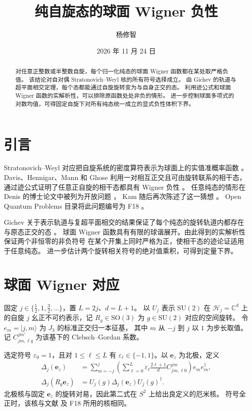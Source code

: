 \documentclass[UTF8,11pt,a4paper]{ctexart}
\title{\textbf{纯自旋态的球面 Wigner 负性}}
\author{杨修智}
\date{2026 年 11 月 24 日}
\theoremstyle{definition}
\newcommand{\SU}{\mathrm{SU}}
\newcommand{\SO}{\mathrm{SO}}
\begin{document}
\maketitle

\begin{abstract}
对任意正整数或半整数自旋，每个归一化纯态的球面 Wigner 函数都在某处取严格负值。
该结论对自对偶 Stratonovich--Weyl 核的所有符号选择成立。
由 Gichev 的轨道与超平面相交定理，每个态都能通过自旋旋转变为与自身正交的态。
利用迹公式和球面 Wigner 函数的实解析性，可以排除原函数处处非负的情形。
进一步控制球面多项式的对数均值，可得固定自旋下对所有纯态统一成立的显式负性体积下界。
\end{abstract}

\section{引言}

Stratonovich--Weyl 对应把自旋系统的密度算符表示为球面上的实值准概率函数
\cite{varilly1989,davis2021}。
Davis、Hennigar、Mann 和 Ghose 利用一对相互正交且可由旋转联系的相干态，
通过迹公式证明了任意正自旋的相干态都具有 Wigner 负性 \cite[第 3 节]{davis2023}。
任意纯态的情形在 Denis 的博士论文中被列为开放问题 \cite[第 3 页]{denis2025}，
Kam 随后再次陈述了这一猜想 \cite[第 I、VI 节]{kam2026}。
Open Quantum Problems 目录将此问题编号为 F18 \cite{f18}。

Gichev 关于表示轨道与复超平面相交的结果保证了每个纯态的旋转轨道内都存在与原态正交的态
\cite[推论 1]{gichev2004}。
球面 Wigner 函数具有有限的球谐展开。由此得到的实解析性保证两个非恒零的非负符号
在某个开集上同时严格为正，使相干态的迹论证适用于任意纯态。
进一步估计两个旋转相关符号的绝对值乘积，可得到定量下界。

\section{球面 Wigner 对应}
\label{sec:kernel}

固定 \(j\in\{\tfrac12,1,\tfrac32,\ldots\}\)，置 \(L=2j\)、\(d=L+1\)。
以 \(U_j\) 表示 \(\SU(2)\) 在 \(\mathcal H_j=\mathbb C^d\) 上的自旋 \(j\)
幺正不可约表示，记 \(R_g\in\SO(3)\) 为 \(g\in\SU(2)\) 对应的空间旋转。
令 \(e_m=|j,m\rangle\) 为 \(J_3\) 的标准正交归一本征基，
其中 \(m\) 从 \(-j\) 到 \(j\) 以 \(1\) 为步长取值。
记 \(C_{jm,\ell q}^{jm'}\) 为该基下的 Clebsch--Gordan 系数。

选定符号 \(\varepsilon_0=1\)，且对 \(1\leq\ell\leq L\) 有
\(\varepsilon_\ell\in\{-1,1\}\)。以 \(\mathbf e_z\) 为北极，定义
\begin{align}
  \Delta_j(\mathbf e_z)
  &=\sum_{m=-j}^{j}
    \left(\sum_{\ell=0}^{L}\varepsilon_\ell
    \frac{2\ell+1}{d}C_{jm,\ell 0}^{jm}\right)e_m e_m^\dagger,
    \label{eq:kernel-north}\\
  \Delta_j(R_g\mathbf e_z)
  &=U_j(g)\Delta_j(\mathbf e_z)U_j(g)^\dagger.
    \label{eq:kernel-covariance}
\end{align}
北极核与固定 \(\mathbf e_z\) 的旋转对易，因此第二式在 \(S^2\) 上给出良定义的厄米核。
符号全正时，该核与文献 \cite[式 (7)--(11)]{davis2021} 及 F18 \cite{f18}
所用的核相同。
\end{document}
